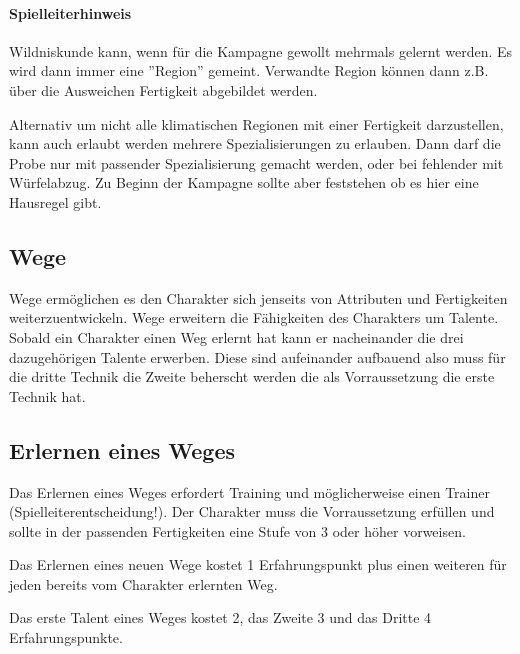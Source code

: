 \documentclass{article}
\begin{document}
\begin{mdframed}[hidealllines=true, backgroundcolor=black!10]
\paragraph{Spielleiterhinweis}

Wildniskunde kann, wenn für die Kampagne gewollt mehrmals gelernt werden. Es wird dann immer eine ''Region'' gemeint.
Verwandte Region können dann z.B. über die Ausweichen Fertigkeit abgebildet werden.

Alternativ um nicht alle klimatischen Regionen mit einer Fertigkeit darzustellen, kann auch erlaubt werden mehrere
Spezialisierungen zu erlauben. Dann darf die Probe nur mit passender Spezialisierung gemacht werden, oder bei
fehlender mit Würfelabzug. Zu Beginn der Kampagne sollte aber feststehen ob es hier eine Hausregel gibt.

\end{mdframed}
\begin{center}
\section{Wege}
\end{center}

Wege ermöglichen es den Charakter sich jenseits von Attributen und Fertigkeiten weiterzuentwickeln. Wege erweitern
die Fähigkeiten des Charakters um Talente.
Sobald ein Charakter einen Weg erlernt hat kann er nacheinander die drei dazugehörigen Talente erwerben. Diese
sind aufeinander aufbauend also muss für die dritte Technik die Zweite beherscht werden die als Vorraussetzung die
erste Technik hat.

\begin{center}
\subsection{Erlernen eines Weges}
\end{center}

Das Erlernen eines Weges erfordert Training und möglicherweise einen Trainer (Spielleiterentscheidung!). Der
Charakter muss die Vorraussetzung erfüllen und sollte in der passenden Fertigkeiten eine Stufe von 3 oder höher
vorweisen.

Das Erlernen eines neuen Wege kostet 1 Erfahrungspunkt plus einen weiteren für jeden bereits vom Charakter erlernten
Weg.

Das erste Talent eines Weges kostet 2, das Zweite 3 und das Dritte 4 Erfahrungspunkte.
\end{document}
